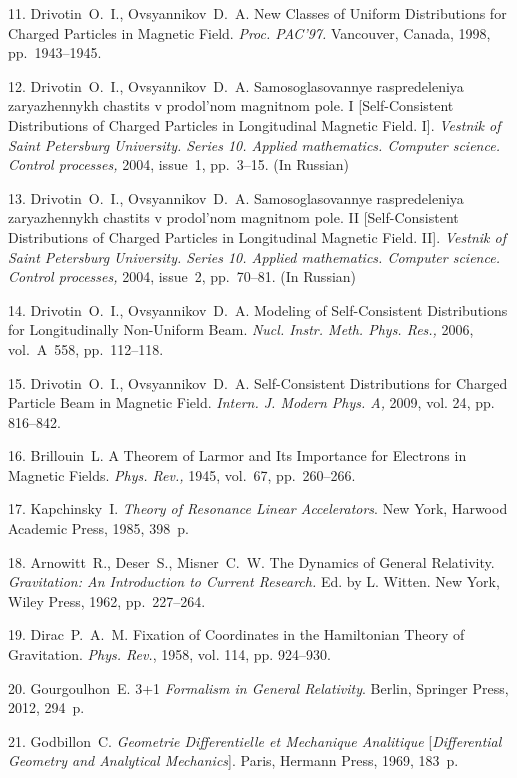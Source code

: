 {11. Drivotin~O.~I., Ovsyannikov~D.~A. New Classes of Uniform
Distributions for Charged Particles in Magnetic Field. {\it Proc.
PAC'97.} Vancouver, Canada, 1998, pp.~1943--1945.


12. Drivotin~O.~I., Ovsyannikov~D.~A. Samosoglasovannye
raspredeleniya zaryazhennykh chastits v prodol'nom magnitnom pole.
I [Self-Consistent Distributions
 of Charged Particles
in Longitudinal Magnetic Field. I]. {\it Vestnik of Saint
Petersburg University. Series 10. Applied mathematics. Computer
science. Control processes,} 2004, issue~1, pp.~3--15. (In
Russian)



13. Drivotin~O.~I., Ovsyannikov~D.~A. Samosoglasovannye
raspredeleniya zaryazhennykh chastits v prodol'nom magnitnom pole.
II [Self-Consistent Distributions
 of Charged Particles
in Longitudinal Magnetic Field. II]. {\it Vestnik of Saint
Petersburg University. Series 10. Applied mathematics. Computer
science. Control processes,} 2004, issue~2, pp.~70--81. (In
Russian)




14. Drivotin~O.~I., Ovsyannikov~D.~A. Modeling of Self-Consistent
Distributions for Longitudinally Non-Uniform Beam. {\it Nucl.
Instr. Meth. Phys. Res.,} 2006,  vol.~A~558, pp.~112--118.



15. Drivotin~O.~I., Ovsyannikov~D.~A. Self-Consistent
Distributions for Charged Particle Beam in Magnetic Field. {\it
Intern. J. Modern Phys. A,} 2009,  {vol. 24}, pp. 816--842.

16.
 Brillouin~L.
A Theorem of Larmor and Its Importance for Electrons in Magnetic
Fields. {\it Phys. Rev.,} 1945,  {vol.~67}, pp.~260--266.

17.
 Kapchinsky~I.
{\it Theory of Resonance  Linear Accelerators}. New York, Harwood
Academic Press, 1985, 398~p.



18.
 Arnowitt~R., Deser~S., Misner~C.~W.
The Dynamics of General Relativity.
 {\it Gravitation: An Introduction to Current Research.}
Ed. by L. Witten. New York, Wiley Press, 1962, pp.~227--264.

19. Dirac~P.~A.~M. Fixation of Coordinates in the Hamiltonian
Theory of Gravitation. {\it Phys. Rev.}, 1958,  vol. 114, pp.
924--930.

20. Gourgoulhon~E.  3+1  {\it Formalism in General Relativity}.
Berlin, Springer Press, 2012, 294~p.



21.
 Godbillon~C. {\it  Geometrie Differentielle et Mechanique Analitique}
[{\it Differential Geometry and Analytical Mechanics}]. Paris,
Hermann Press, 1969, 183~p.

}
